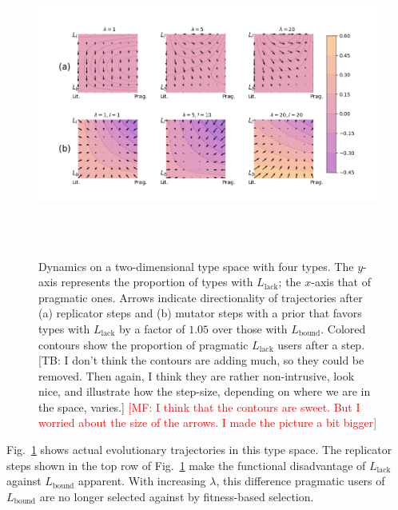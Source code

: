 \documentclass[a4paper, 11pt]{article}
\theoremstyle{Satz}
\newcommand{\mf}[1]{\textcolor{Red}{[MF: #1]}}
\newcommand{\tb}[1]{\textcolor[rgb]{.8,.33,.0}{[TB: #1]}}%
\newcommand{\mylang}[1]{\ensuremath{L_{\text{#1}}}\xspace} %
\newcommand{\Lbound}{\mylang{bound}}
\newcommand{\Llack}{\mylang{lack}}
\begin{document}
\begin{figure}[t]
\centering
\includegraphics[width=1.08\textwidth,height=10cm, keepaspectratio]{./plots/fig-contourb105k5.png}
\caption{Dynamics on a two-dimensional type space with four types. The $y$-axis represents the
  proportion of types with $\Llack$; the $x$-axis that of pragmatic ones. Arrows indicate
  directionality of trajectories after (a) replicator steps and (b) mutator steps with a prior
  that favors types with $\Llack$ by a factor of $1.05$ over those with $\Lbound$. Colored
  contours show the proportion of pragmatic $\Llack$ users after a step. \tb{I don't think the
    contours are adding much, so they could be removed. Then again, I think they are rather
    non-intrusive, look nice, and illustrate how the step-size, depending on where we are in
    the space, varies.} \mf{I think that the contours are sweet. But I worried about the size
  of the arrows. I made the picture a bit bigger}}

\label{fig:quiver}
\end{figure}

Fig.~\ref{fig:quiver} shows actual evolutionary trajectories in this type space. The replicator
steps shown in the top row of Fig.~\ref{fig:quiver} make the functional disadvantage of
$\Llack$ against $\Lbound$ apparent. With increasing $\lambda$, this difference pragmatic users
of $\Lbound$ are no longer selected against by fitness-based selection. 
\end{document}
